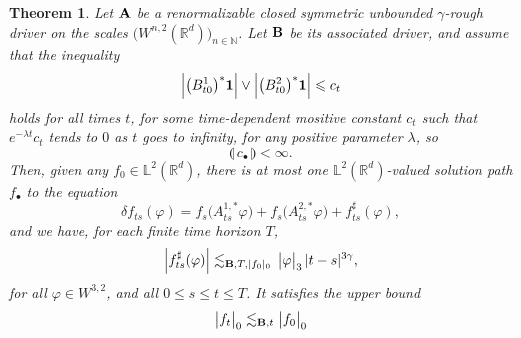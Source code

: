 \documentclass[11pt,a4paper]{amsart}
\newcommand{\NN}{\mathbb{N}}  \newcommand{\ZZ}{\mathbb{Z}}  \newcommand{\QQ}{\mathbb{Q}}  \newcommand{\HH}{\mathbb{H}}
\newcommand{\RR}{\mathbb{R}}  \newcommand{\CC}{\mathbb{C}}  \newcommand{\LL}{\mathbb{L}}  \newcommand{\WW}{\mathbb{W}}
\renewcommand{\leq}{\leqslant}
\newcommand{\ssk}{\smallskip}
\newtheorem{thm}{\hspace{-0.15cm}  {\sc Theorem} } %
\numberwithin{equation}{section} %
\begin{document}
\begin{thm}
\label{ThmRDEHilbertGeneralClosed}
Let $\bf A$ be a renormalizable  \emph{closed symmetric} unbounded $\gamma$-rough driver on the scales $\big(W^{n,2}(\RR^d)\big)_{n\in\NN}$. Let $\bf B$ be its associated driver, and assume that the inequality
\begin{equation}
\label{BoundPhi}
\Big|\big(B^1_{t0}\big)^*{\bf 1} \Big| \vee \Big|\big(B^2_{t0}\big)^*{\bf 1} \Big| \leq c_t
\end{equation}
holds for all times $t$, for some time-dependent mositive constant $c_t$ such that $e^{-\lambda t}c_t$ tends to $0$ as $t$ goes to infinity, for any positive parameter $\lambda$, so
$$
\llparenthesis\,c_\bullet\,\rrparenthesis < \infty.
$$
 Then, given any $f_0\in\LL^2(\RR^d)$, there is at most one $\LL^2(\RR^d)$-valued solution path $f_\bullet$ to the equation
\begin{equation}
\label{EqLinearRDEHilbert}
\delta f_{ts}(\varphi) = f_s\Big(A^{1,*}_{ts}\varphi\Big) + f_s\Big(A^{2,*}_{ts}\varphi\Big) + f^\sharp_{ts}(\varphi),
\end{equation}
and we have, for each finite time horizon $T$, 
\begin{equation}
\label{EqBoundRemainder}
\Big| f^\sharp_{ts}(\varphi) \Big| \lesssim_{{\bf B},T, | f_0|_0}\,\big|\varphi\big|_3\,|t-s|^{3\gamma},
\end{equation}
for all $\varphi\in W^{3,2}$, and all $0\leq s\leq t\leq T$. It satisfies the upper bound
\begin{equation}
\label{EqAPrioriBoundNorm}
\big| f_t\big|_0\lesssim_{{\bf B}, t} \big| f_0\big|_0
\end{equation}
\end{thm}

\ssk
 
\end{document}

